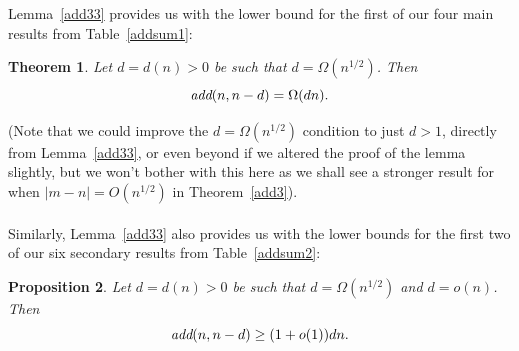 \documentclass{article}
\newtheorem{Theorem}{Theorem}
\newtheorem{Proposition}[Theorem]{Proposition}
\newtheorem{Proof of Theorem}{Proof of Theorem}
\begin{document}
Lemma~\ref{add33} provides us with the lower bound for the first of our four main results from Table~\ref{addsum1}:















\begin{Theorem} \label{add53}
Let $d=d(n)>0$ be such that $d= \Omega(n^{1/2})$.
Then 
\begin{displaymath}
\emph{add}(n,n-d) =\Omega(dn).
\end{displaymath} 
\end{Theorem}
\phantom{p}















(Note that we could improve the $d=\Omega(n^{1/2})$ condition to just $d>1$,
directly from Lemma~\ref{add33},
or even beyond if we altered the proof of the lemma slightly,
but we won't bother with this here 
as we shall see a stronger result for when $|m-n|=O(n^{1/2})$ in Theorem~\ref{add3}). \\
\\















Similarly, 
Lemma~\ref{add33} also provides us with the lower bounds for the first two of our six secondary results
from Table~\ref{addsum2}:















\begin{Proposition} \label{add51}
Let $d=d(n)>0$ be such that $d=\Omega(n^{1/2})$ and $d=o(n)$.
Then 
\begin{displaymath}
\emph{add}(n,n-d) \geq (1+o(1)) dn. 
\end{displaymath} 
\end{Proposition} 
\phantom{p}
\end{document}

